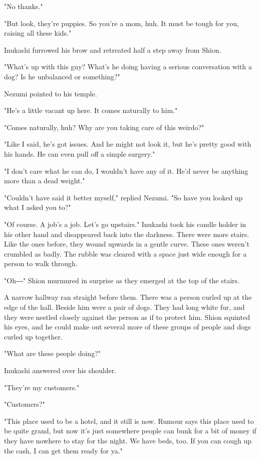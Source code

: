 "No thanks."

"But look, they're puppies. So you're a mom, huh. It must be tough for
you, raising all these kids."

Inukashi furrowed his brow and retreated half a step away from Shion.

"What's up with this guy? What's he doing having a serious conversation
with a dog? Is he unbalanced or something?"

Nezumi pointed to his temple.

"He's a little vacant up here. It comes naturally to him."

"Comes naturally, huh? Why are you taking care of this weirdo?"

"Like I said, he's got issues. And he might not look it, but he's pretty
good with his hands. He can even pull off a simple surgery."

"I don't care what he can do, I wouldn't have any of it. He'd never be
anything more than a dead weight."

"Couldn't have said it better myself," replied Nezumi. "So have you
looked up what I asked you to?"

"Of course. A job's a job. Let's go upstairs." Inukashi took his candle
holder in his other hand and disappeared back into the darkness. There
were more stairs. Like the ones before, they wound upwards in a gentle
curve. These ones weren't crumbled as badly. The rubble was cleared with
a space just wide enough for a person to walk through.

"Oh―" Shion murmured in surprise as they emerged at the top of the
stairs.

A narrow hallway ran straight before them. There was a person curled up
at the edge of the hall. Beside him were a pair of dogs. They had long
white fur, and they were nestled closely against the person as if to
protect him. Shion squinted his eyes, and he could make out several more
of these groups of people and dogs curled up together.

"What are these people doing?"

Inukashi answered over his shoulder.

"They're my customers."

"Customers?"

"This place used to be a hotel, and it still is now. Rumour says this
place used to be quite grand, but now it's just somewhere people can
bunk for a bit of money if they have nowhere to stay for the night. We
have beds, too. If you can cough up the cash, I can get them ready for
ya."

